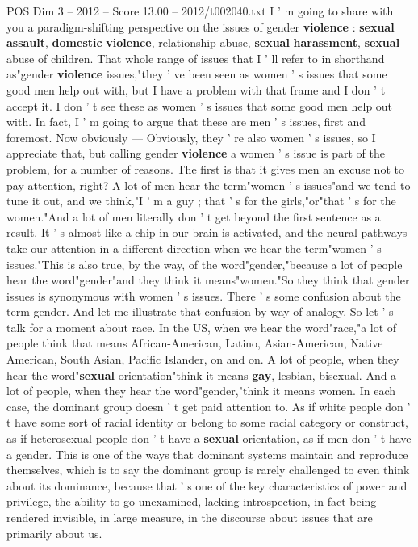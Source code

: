 \begin{textsample}{POS Dim 3 – 2012 – Score 13.00 – 2012/t002040.txt}  \label{ex:f3_pos_046}
I ' m going to share with you a paradigm-shifting perspective on the issues of gender \textbf{violence} : \textbf{sexual} \textbf{assault}, \textbf{domestic} \textbf{violence}, relationship abuse, \textbf{sexual} \textbf{harassment}, \textbf{sexual} abuse of children.
That whole range of issues that I ' ll refer to in shorthand as"gender \textbf{violence} issues,"they ' ve been seen as women ' s issues that some good men help out with, but I have a problem with that frame and I don ' t accept it.
I don ' t see these as women ' s issues that some good men help out with.
In fact, I ' m going to argue that these are men ' s issues, first and foremost.
Now obviously — Obviously, they ' re also women ' s issues, so I appreciate that, but calling gender \textbf{violence} a women ' s issue is part of the problem, for a number of reasons.
The first is that it gives men an excuse not to pay attention, right?
A lot of men hear the term"women ' s issues"and we tend to tune it out, and we think,"I ' m a guy ; that ' s for the girls,"or"that ' s for the women."And a lot of men literally don ' t get beyond the first sentence as a result.
It ' s almost like a chip in our brain is activated, and the neural pathways take our attention in a different direction when we hear the term"women ' s issues."This is also true, by the way, of the word"gender,"because a lot of people hear the word"gender"and they think it means"women."So they think that gender issues is synonymous with women ' s issues.
There ' s some confusion about the term gender.
And let me illustrate that confusion by way of analogy.
So let ' s talk for a moment about race.
In the US, when we hear the word"race,"a lot of people think that means African-American, Latino, Asian-American, Native American, South Asian, Pacific Islander, on and on.
A lot of people, when they hear the word"\textbf{sexual} orientation"think it means \textbf{gay}, lesbian, bisexual.
And a lot of people, when they hear the word"gender,"think it means women.
In each case, the dominant group doesn ' t get paid attention to.
As if white people don ' t have some sort of racial identity or belong to some racial category or construct, as if heterosexual people don ' t have a \textbf{sexual} orientation, as if men don ' t have a gender.
This is one of the ways that dominant systems maintain and reproduce themselves, which is to say the dominant group is rarely challenged to even think about its dominance, because that ' s one of the key characteristics of power and privilege, the ability to go unexamined, lacking introspection, in fact being rendered invisible, in large measure, in the discourse about issues that are primarily about us.

\end{textsample}
